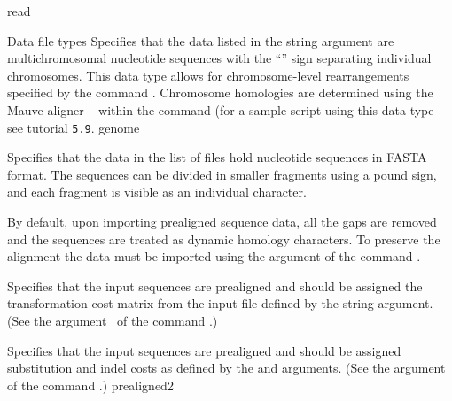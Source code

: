 \begin{command}{read}{}
\begin{arguments}
\begin{argumentgroup}{Data file types}
            {Specifies that the data listed in the string argument are
            multichromosomal nucleotide sequences with the ``\atsymbol'' sign 
            separating individual chromosomes. This data type
            allows for chromosome-level rearrangements specified by
           the command . Chromosome
            homologies are determined using the Mauve aligner ~\cite{darlingetal2004} within 	 	
            the command 
            (for a sample script using this data type see tutorial \texttt{5.9}.} 
            {genome}
            
            {Specifies that the data in the list of files hold nucleotide
            sequences in FASTA format. The sequences can be divided in smaller
            fragments using a pound sign, and each fragment is visible as an
            individual character.} 
            {}

	\begin{statement}
            By default, upon importing prealigned sequence data, all the gaps are
             removed and the sequences are treated as dynamic homology characters.
             To preserve the alignment the data must be imported using the
              argument of the command .
          \end{statement}
        
            {Specifies that the input sequences are prealigned and
            should be assigned the transformation cost matrix from the 
            input file defined by the string argument. (See the argument~ 
            of the command .)}
            {}
        
            {Specifies that the input sequences are prealigned and should be
            assigned substitution and indel costs as defined by the
             and  arguments. (See the argument~ 
            of the command .)}
            {prealigned2}


\end{argumentgroup}
\end{arguments}
\end{command}
